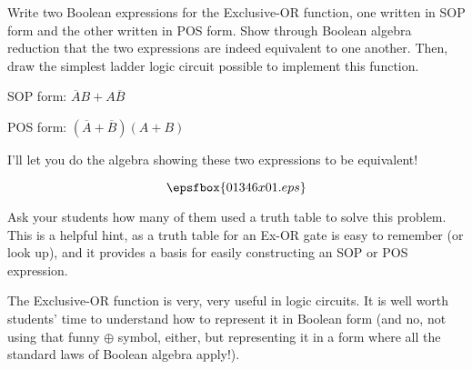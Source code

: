 

Write two Boolean expressions for the Exclusive-OR function, one written in SOP form and the other written in POS form.  Show through Boolean algebra reduction that the two expressions are indeed equivalent to one another.  Then, draw the simplest ladder logic circuit possible to implement this function.







SOP form: \hskip 10pt $\overline{A}B + A\overline{B}$

\vskip 10pt

POS form: \hskip 10pt $(\overline{A} + \overline{B})(A + B)$

\vskip 10pt

I'll let you do the algebra showing these two expressions to be equivalent!

$$\epsfbox{01346x01.eps}$$







Ask your students how many of them used a truth table to solve this problem.  This is a helpful hint, as a truth table for an Ex-OR gate is easy to remember (or look up), and it provides a basis for easily constructing an SOP or POS expression.

The Exclusive-OR function is very, very useful in logic circuits.  It is well worth students' time to understand how to represent it in Boolean form (and no, not using that funny $\oplus$ symbol, either, but representing it in a form where all the standard laws of Boolean algebra apply!).




